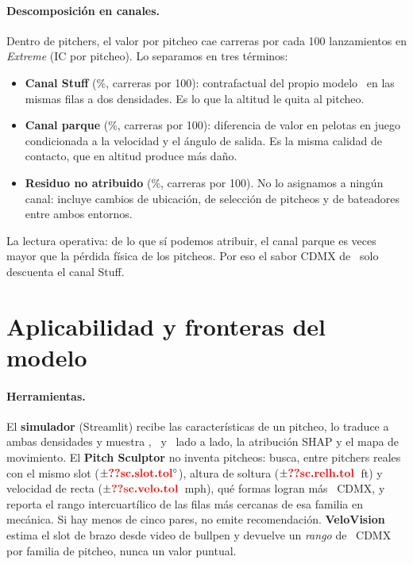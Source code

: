 \documentclass[10pt]{article}
\begin{document}
\paragraph{Descomposición en canales.} Dentro de  pitchers, el valor por pitcheo cae  carreras por cada 100 lanzamientos en \emph{Extreme} (IC  por pitcheo). Lo separamos en tres términos:
\begin{itemize}
  \item \textbf{Canal Stuff} (\%,  carreras por 100): contrafactual del propio modelo \splus\ en las mismas filas a dos densidades. Es lo que la altitud le quita al pitcheo.
  \item \textbf{Canal parque} (\%,  carreras por 100): diferencia de valor en pelotas en juego condicionada a la velocidad y el ángulo de salida. Es la misma calidad de contacto, que en altitud produce más daño.
  \item \textbf{Residuo no atribuido} (\%,  carreras por 100). No lo asignamos a ningún canal: incluye cambios de ubicación, de selección de pitcheos y de bateadores entre ambos entornos.
\end{itemize}
La lectura operativa: de lo que sí podemos atribuir, el canal parque es  veces mayor que la pérdida física de los pitcheos. Por eso el sabor CDMX de \splus\ solo descuenta el canal Stuff.

\section{Aplicabilidad y fronteras del modelo}
\label{sec:aplicacion}

\paragraph{Herramientas.} El \textbf{simulador} (Streamlit) recibe las características de un pitcheo, lo traduce a ambas densidades y muestra \splus, \lplus\ y \pplus\ lado a lado, la atribución SHAP y el mapa de movimiento. El \textbf{Pitch Sculptor} no inventa pitcheos: busca, entre pitchers reales con el mismo slot ($\pm\cf{sc.slot.tol}^\circ$), altura de soltura ($\pm\cf{sc.relh.tol}$~ft) y velocidad de recta ($\pm\cf{sc.velo.tol}$~mph), qué formas logran más \splus\ CDMX, y reporta el rango intercuartílico de las filas más cercanas de esa familia en mecánica. Si hay menos de cinco pares, no emite recomendación. \textbf{VeloVision} estima el slot de brazo desde video de bullpen y devuelve un \emph{rango} de \splus\ CDMX por familia de pitcheo, nunca un valor puntual.
\end{document}
